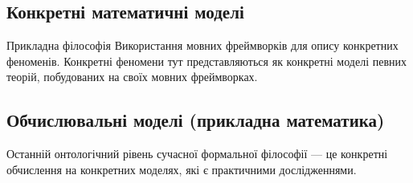 \subsection*{Конкретні математичні моделі}

Прикладна філософія Використання мовних фреймворків для опису
конкретних феноменів. Конкретні феномени тут представляються
як конкретні моделі певних теорій, побудованих на своїх мовних фреймворках.

\subsection*{Обчислювальні моделі (прикладна математика)}

Останній онтологічний рівень сучасної формальної філософії --- це конкретні
обчислення на конкретних моделях, які є практичними дослідженнями.



